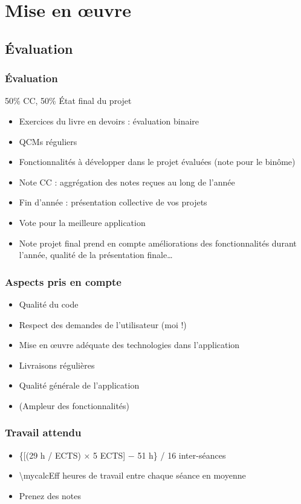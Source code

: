 \documentclass[english, french]{beamer}
\begin{document}
\section{Mise en œuvre}
\subsection{Évaluation}
\begin{frame}
	\frametitle{Évaluation}
	50\% CC, 50\% État final du projet
	\begin{itemize}
		\item Exercices du livre en devoirs : évaluation binaire
		\item QCMs réguliers
		\item Fonctionnalités à développer dans le projet évaluées (note pour le binôme)
		\item Note CC : aggrégation des notes reçues au long de l’année
		\item Fin d’année : présentation collective de vos projets
		\item Vote pour la meilleure application
		\item Note projet final prend en compte améliorations des fonctionnalités durant l’année, qualité de la présentation finale…
	\end{itemize}
\end{frame}

\begin{frame}
	\frametitle{Aspects pris en compte}
	\begin{itemize}
		\item Qualité du code 
		\item Respect des demandes de l’utilisateur (moi !)
		\item Mise en œuvre adéquate des technologies dans l’application
		\item Livraisons régulières
		\item Qualité générale de l’application
		\item (Ampleur des fonctionnalités)
	\end{itemize}
\end{frame}

\begin{frame}
	\frametitle{Travail attendu}
	\begin{itemize}
		\item \{[(29 h / ECTS) × 5 ECTS] − 51 h\} / 16 inter-séances
		\item \num[round-mode=places, round-precision=0, mode=text]{\mycalcEff} heures de travail entre chaque séance en moyenne
		\item Prenez des notes
	\end{itemize}
\end{frame}
\end{document}
